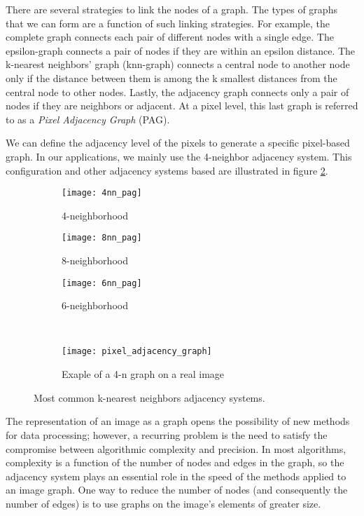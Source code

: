 There are several strategies to link the nodes of a graph. The types of graphs that we can form are a function of such linking strategies. For example, the complete graph connects each pair of different nodes with a single edge. The epsilon-graph connects a pair of nodes if they are within an epsilon distance. The k-nearest neighbors' graph (knn-graph) connects a central node to another node only if the distance between them is among the k smallest distances from the central node to other nodes. Lastly, the adjacency graph connects only a pair of nodes if they are neighbors or adjacent. At a pixel level, this last graph is referred to as a  \textit{Pixel Adjacency Graph} (PAG).

We can define the adjacency level of the pixels to generate a specific pixel-based graph. In our applications, we mainly use the 4-neighbor adjacency system. This configuration and other adjacency systems based are illustrated in figure \ref{fig:pixel_adjacency_graph}.


\begin{figure}[!ht]
    \centering

	\begin{subfigure}[b]{0.2\textwidth}
    	\texttt{[image: 4nn\_pag]}
        \caption{ 4-neighborhood}
    \end{subfigure}\qquad   
    \begin{subfigure}[b]{0.2\textwidth}
    	\texttt{[image: 8nn\_pag]}
        \caption{8-neighborhood}
    \end{subfigure}\qquad
    \begin{subfigure}[b]{0.23\textwidth}
    	\texttt{[image: 6nn\_pag]}
        \caption{6-neighborhood}
    \end{subfigure}\\[5ex]    
    \begin{subfigure}[b]{0.5\textwidth}
        \texttt{[image: pixel\_adjacency\_graph]}
        \caption{Exaple of a 4-n graph on a real image}
        \label{fig:pag_example}
    \end{subfigure}         
        	    
    \caption{Most common k-nearest neighbors adjacency systems.}\label{fig:pixel_adjacency_graph}    
\end{figure}

The representation of an image as a graph opens the possibility of new methods for data processing; however, a recurring problem is the need to satisfy the compromise between algorithmic complexity and precision. In most algorithms, complexity is a function of the number of nodes and edges in the graph, so the adjacency system plays an essential role in the speed of the methods applied to an image graph. One way to reduce the number of nodes (and consequently the number of edges) is to use graphs on the image's elements of greater size.

